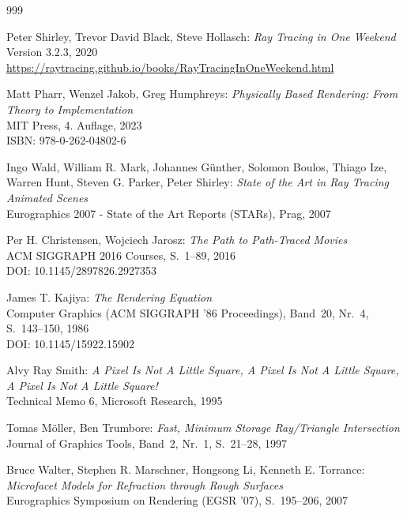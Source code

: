 \begin{thebibliography}{999}

	Peter Shirley, Trevor David Black, Steve Hollasch:
	  \emph{Ray Tracing in One Weekend} \\
	  Version 3.2.3, 2020 \\
	  \href{https://raytracing.github.io/books/RayTracingInOneWeekend.html}{https://raytracing.github.io/books/RayTracingInOneWeekend.html}

	Matt Pharr, Wenzel Jakob, Greg Humphreys:
	  \emph{Physically Based Rendering: From Theory to Implementation} \\
	  MIT Press, 4. Auflage, 2023 \\
	  ISBN: 978-0-262-04802-6

	Ingo Wald, William R. Mark, Johannes G{\"u}nther, Solomon Boulos, Thiago Ize, Warren Hunt, Steven G. Parker, Peter Shirley:
	  \emph{State of the Art in Ray Tracing Animated Scenes} \\
	  Eurographics 2007 - State of the Art Reports (STARs), Prag, 2007

	Per H. Christensen, Wojciech Jarosz:
	  \emph{The Path to Path-Traced Movies} \\
	  ACM SIGGRAPH 2016 Courses, S.~1--89, 2016 \\
	  DOI: 10.1145/2897826.2927353

	James T. Kajiya:
	  \emph{The Rendering Equation} \\
	  Computer Graphics (ACM SIGGRAPH '86 Proceedings), Band~20, Nr.~4, S.~143--150, 1986 \\
	  DOI: 10.1145/15922.15902

	Alvy Ray Smith:
	  \emph{A Pixel Is Not A Little Square, A Pixel Is Not A Little Square, A Pixel Is Not A Little Square!} \\
	  Technical Memo 6, Microsoft Research, 1995

	Tomas M{\"o}ller, Ben Trumbore:
	  \emph{Fast, Minimum Storage Ray/Triangle Intersection} \\
	  Journal of Graphics Tools, Band~2, Nr.~1, S.~21--28, 1997

	Bruce Walter, Stephen R. Marschner, Hongsong Li, Kenneth E. Torrance:
	  \emph{Microfacet Models for Refraction through Rough Surfaces} \\
	  Eurographics Symposium on Rendering (EGSR '07), S.~195--206, 2007


\end{thebibliography}
